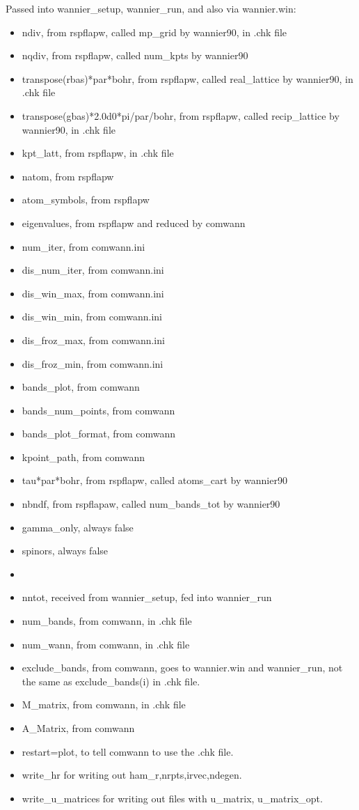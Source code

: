 \documentclass[aps,prb,singlecolumn,preprintnumbers,amsmath,amssymb]{revtex4}
\begin{document}
Passed into wannier\_setup, wannier\_run, and also via wannier.win:
\begin{itemize}
\item ndiv, from rspflapw, called mp\_grid by wannier90, in .chk file
\item nqdiv, from rspflapw, called num\_kpts by wannier90
\item transpose(rbas)*par*bohr, from rspflapw, called real\_lattice by wannier90, in .chk file
\item transpose(gbas)*2.0d0*pi/par/bohr, from rspflapw, called recip\_lattice by wannier90, in .chk file
\item kpt\_latt, from rspflapw, in .chk file
\item natom, from rspflapw
\item atom\_symbols, from rspflapw
\item eigenvalues, from rspflapw and reduced by comwann
\item num\_iter, from comwann.ini
\item dis\_num\_iter,  from comwann.ini
\item dis\_win\_max,  from comwann.ini
\item dis\_win\_min,  from comwann.ini
\item dis\_froz\_max,  from comwann.ini
\item dis\_froz\_min,  from comwann.ini
\item bands\_plot, from comwann
\item bands\_num\_points, from comwann
\item  bands\_plot\_format,  from comwann
\item kpoint\_path,  from comwann
\item tau*par*bohr, from rspflapw, called atoms\_cart by wannier90
\item nbndf, from rspflapaw, called num\_bands\_tot by wannier90
\item gamma\_only, always false
\item spinors, always false
\item
\item nntot, received from wannier\_setup, fed into wannier\_run
\item num\_bands, from comwann, in .chk file
\item num\_wann,    from comwann, in .chk file
\item exclude\_bands, from comwann, goes to wannier.win and wannier\_run, not the same as exclude\_bands(i) in .chk file.
\item M\_matrix,  from comwann, in .chk file
\item A\_Matrix,  from comwann
\item restart=plot, to tell comwann to use the .chk file.
\item write\_hr for writing out  ham\_r,nrpts,irvec,ndegen.
\item write\_u\_matrices for writing out files with u\_matrix, u\_matrix\_opt.
\end{itemize}
\end{document}
